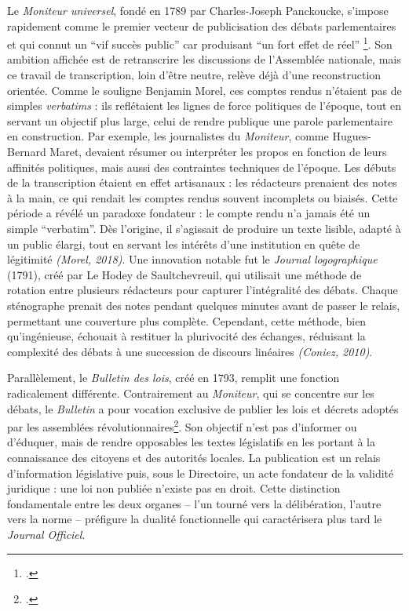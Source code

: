 Le \emph{Moniteur universel}, fondé en 1789 par Charles-Joseph Panckoucke, s’impose rapidement comme le premier vecteur de publicisation des débats parlementaires et qui connut un \enquote{vif succès public} car produisant \enquote{un fort effet de réel} \footcite[][]{coniez}. Son ambition affichée est de retranscrire les discussions de l’Assemblée nationale, mais ce travail de transcription, loin d’être neutre, relève déjà d’une reconstruction orientée. Comme le souligne Benjamin Morel, ces comptes rendus n’étaient pas de simples \emph{verbatims} : ils reflétaient les lignes de force politiques de l’époque, tout en servant un objectif plus large, celui de rendre publique une parole parlementaire en construction. Par exemple, les journalistes du \emph{Moniteur}, comme Hugues-Bernard Maret, devaient résumer ou interpréter les propos en fonction de leurs affinités politiques, mais aussi des contraintes techniques de l’époque. Les débuts de la transcription étaient en effet artisanaux : les rédacteurs prenaient des notes à la main, ce qui rendait les comptes rendus souvent incomplets ou biaisés. Cette période a révélé un paradoxe fondateur : le compte rendu n’a jamais été un simple \enquote{verbatim}. Dès l’origine, il s’agissait de produire un texte lisible, adapté à un public élargi, tout en servant les intérêts d’une institution en quête de légitimité \emph{(Morel, 2018)}. Une innovation notable fut le \emph{Journal logographique} (1791), créé par Le Hodey de Saultchevreuil, qui utilisait une méthode de rotation entre plusieurs rédacteurs pour capturer l’intégralité des débats. Chaque sténographe prenait des notes pendant quelques minutes avant de passer le relais, permettant une couverture plus complète. Cependant, cette méthode, bien qu’ingénieuse, échouait à restituer la plurivocité des échanges, réduisant la complexité des débats à une succession de discours linéaires \emph{(Coniez, 2010)}.

Parallèlement, le \emph{Bulletin des lois}, créé en 1793, remplit une fonction radicalement différente. Contrairement au \emph{Moniteur}, qui se concentre sur les débats, le \emph{Bulletin} a pour vocation exclusive de publier les lois et décrets adoptés par les assemblées révolutionnaires\footcite[][]{saudrais}. Son objectif n’est pas d’informer ou d’éduquer, mais de rendre opposables les textes législatifs en les portant à la connaissance des citoyens et des autorités locales. La publication est un relais d’information législative puis, sous le Directoire, un acte fondateur de la validité juridique : une loi non publiée n’existe pas en droit. Cette distinction fondamentale entre les deux organes – l’un tourné vers la délibération, l’autre vers la norme – préfigure la dualité fonctionnelle qui caractérisera plus tard le \emph{Journal Officiel}.

